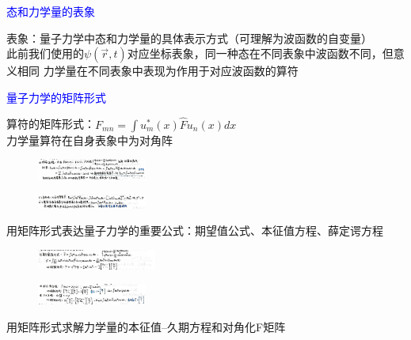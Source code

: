 \documentclass[a4paper,8pt]{extarticle} %
\newcommand{\bluetext}[1]{\textcolor{blue}{#1}}
\begin{document}
\begin{multicols}{3}
\bluetext{态和力学量的表象}

表象：量子力学中态和力学量的具体表示方式（可理解为波函数的自变量）\\
此前我们使用的$\psi(\vec{r},t)$对应坐标表象，同一种态在不同表象中波函数不同，但意义相同
力学量在不同表象中表现为作用于对应波函数的算符

\bluetext{量子力学的矩阵形式}

算符的矩阵形式：$F_{mn}= \int u_m^*(x) \hat{F}u_n(x) dx$\\
力学量算符在自身表象中为对角阵\\
\begin{figure}[H]
    \vspace{-0.5cm}
    \centering
    \includegraphics[width=0.32\textwidth]{images/13.png}
    \vspace{-0.6cm}
\end{figure}
\begin{figure}[H]
    \vspace{-0.5cm}
    \centering
    \includegraphics[width=0.32\textwidth]{images/14.png}
    \vspace{-0.6cm}
\end{figure}
用矩阵形式表达量子力学的重要公式：期望值公式、本征值方程、薛定谔方程\\
\begin{figure}[H]
    \vspace{-0.5cm}
    \centering
    \includegraphics[width=0.35\textwidth]{images/15.png}
    \vspace{-0.6cm}
\end{figure}
\begin{figure}[H]
    \vspace{-0.5cm}
    \centering
    \includegraphics[width=0.32\textwidth]{images/16.png}
    \vspace{-0.6cm}
\end{figure}
用矩阵形式求解力学量的本征值--久期方程和对角化F矩阵
\begin{figure}[H]

\end{figure}
\end{multicols}
\end{document}
